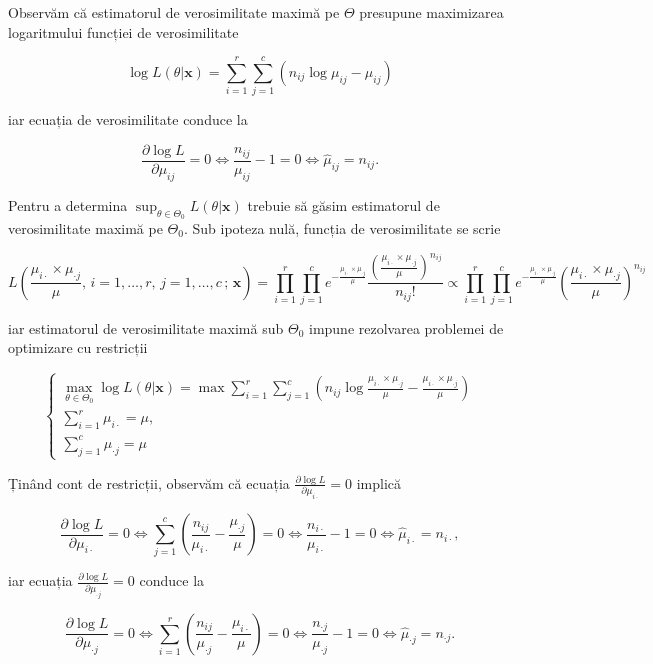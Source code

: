 \documentclass[]{article}
\begin{document}
Observăm că estimatorul de verosimilitate maximă pe \(\Theta\) presupune
maximizarea logaritmului funcției de verosimilitate

\[
\log L(\theta|\mathbf{x}) = \sum_{i = 1}^{r}\sum_{j = 1}^{c}(n_{ij}\log{\mu_{ij}} - \mu_{ij})
\]

iar ecuația de verosimilitate conduce la

\[
\frac{\partial \log{L}}{\partial \mu_{ij}} = 0 \iff \frac{n_{ij}}{\mu_{ij}} - 1 = 0 \iff \boxed{\hat{\mu}_{ij} = n_{ij}}.
\]

Pentru a determina \(\sup_{\theta\in\Theta_0}L(\theta|\mathbf{x})\)
trebuie să găsim estimatorul de verosimilitate maximă pe \(\Theta_0\).
Sub ipoteza nulă, funcția de verosimilitate se scrie

\[
L\left(\frac{\mu_{i\cdot}\times \mu_{\cdot j}}{\mu},\, i = 1,\ldots,r,\,j = 1,\ldots, c\,;\,\mathbf{x}\right) = \prod_{i = 1}^{r}\prod_{j = 1}^{c}e^{-\frac{\mu_{i\cdot}\times \mu_{\cdot j}}{\mu}}\frac{\left(\frac{\mu_{i\cdot}\times \mu_{\cdot j}}{\mu}\right)^{n_{ij}}}{n_{ij}!}\propto \prod_{i = 1}^{r}\prod_{j = 1}^{c}e^{-\frac{\mu_{i\cdot}\times \mu_{\cdot j}}{\mu}}\left(\frac{\mu_{i\cdot}\times \mu_{\cdot j}}{\mu}\right)^{n_{ij}}
\]

iar estimatorul de verosimilitate maximă sub \(\Theta_0\) impune
rezolvarea problemei de optimizare cu restricții

\[
  \left\{\begin{array}{lll}
    \max_{\theta\in\Theta_0} \log L(\theta|\mathbf{x}) = \max \sum_{i = 1}^{r}\sum_{j = 1}^{c}\left(n_{ij}\log{\frac{\mu_{i\cdot}\times \mu_{\cdot j}}{\mu}} - \frac{\mu_{i\cdot}\times \mu_{\cdot j}}{\mu}\right)\\
    \sum_{i = 1}^{r}\mu_{i\cdot} = \mu,\\
    \sum_{j = 1}^{c}\mu_{\cdot j} = \mu
  \end{array}\right.
\]

Ținând cont de restricții, observăm că ecuația
\(\frac{\partial \log{L}}{\partial \mu_{i\cdot}} = 0\) implică

\[
\frac{\partial \log{L}}{\partial \mu_{i\cdot}} = 0 \iff \sum_{j = 1}^{c}\left(\frac{n_{ij}}{\mu_{i\cdot}} - \frac{\mu_{\cdot j}}{\mu}\right) = 0 \iff \frac{n_{i\cdot}}{\mu_{i\cdot}} - 1 = 0 \iff \boxed{\hat{\mu}_{i\cdot} = n_{i\cdot}},
\]

iar ecuația \(\frac{\partial \log{L}}{\partial \mu_{\cdot j}} = 0\)
conduce la

\[
\frac{\partial \log{L}}{\partial \mu_{\cdot j}} = 0 \iff \sum_{i = 1}^{r}\left(\frac{n_{ij}}{\mu_{\cdot j}} - \frac{\mu_{i\cdot}}{\mu}\right) = 0 \iff \frac{n_{\cdot j}}{\mu_{\cdot j}} - 1 = 0 \iff \boxed{\hat{\mu}_{\cdot j} = n_{\cdot j}}.
\]
\end{document}
